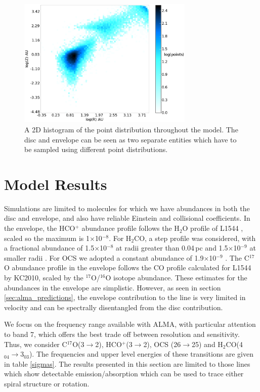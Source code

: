 \documentclass[useAMS,usenatbib]{mn2e}
\begin{document}
\begin{figure}
 \includegraphics[width=84mm]{Figures/model/fig07.eps}
 \caption{A 2D histogram of the point distribution throughout the model. The disc and envelope can be seen as two separate entities which have to be sampled using different point distributions.}
 \label{points}
\end{figure}


\section{Model Results} \label{sec:model_results}

Simulations are limited to molecules for which we have abundances in both the disc and envelope, and also have reliable Einstein and collisional coefficients. In the envelope, the HCO$^+$ abundance profile follows the H$_2$O profile of L1544 \citep{Caselli2012}, scaled so the maximum is 1$\times$10$^{-8}$. For H$_2$CO, a step profile was considered, with a fractional abundance of 1.5$\times$10$^{-8}$ at radii greater than 0.04$\,$pc and 1.5$\times$10$^{-9}$ at smaller radii \citep{Young2004}. For OCS we adopted a constant abundance of 1.9$\times$10$^{-9}$ \citep{Ren2011}. The C$^{17}$O abundance profile in the envelope follows the CO profile calculated for L1544 by KC2010, scaled by the $^{17}$O/$^{16}$O isotope abundance. These estimates for the abundances in the envelope are simplistic. However, as seen in section \ref{sec:alma_predictions}, the envelope contribution to the line is very limited in velocity and can be spectrally disentangled from the disc contribution.\smallskip

We focus on the frequency range available with ALMA, with particular attention to band 7, which offers the best trade off between resolution and sensitivity. Thus, we consider C$^{17}$O(3$\rightarrow$2), HCO$^+$(3$\rightarrow$2), OCS (26$\rightarrow$25) and H$_2$CO(4$_{04}\rightarrow$3$_{03}$).  The frequencies and upper level energies of these transitions are given in table \ref{sigmas}. The results presented in this section are limited to those lines which show detectable emission/absorption which can be used to trace either spiral structure or rotation.\smallskip
\end{document}
